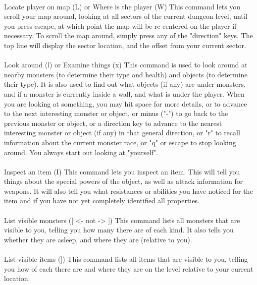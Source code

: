 \paragraph{}Locate player on map (L) or Where is the player (W) This
command lets you scroll your map around, looking at all sectors of the
current dungeon level, until you press escape, at which point the map
will be re-centered on the player if necessary. To scroll the map
around, simply press any of the "direction" keys. The top line will
display the sector location, and the offset from your current sector.

\paragraph{}Look around (l) or Examine things (x) This command is used
to look around at nearby monsters (to determine their type and health)
and objects (to determine their type). It is also used to find out what
objects (if any) are under monsters, and if a monster is currently
inside a wall, and what is under the player.  When you are looking at
something, you may hit space for more details, or to advance to the next
interesting monster or object, or minus ("-") to go back to the previous
monster or object, or a direction key to advance to the nearest
interesting monster or object (if any) in that general direction, or "r"
to recall information about the current monster race, or "q" or escape
to stop looking around. You always start out looking at "yourself".

\paragraph{}Inspect an item (I) This command lets you inspect an item.
This will tell you things about the special powers of the object, as
well as attack information for weapons. It will also tell you what
resistances or abilities you have noticed for the item and if you have
not yet completely identified all properties.
        
\paragraph{}List visible monsters ([ <- not -> ]) This command lists all
monsters that are visible to you, telling you how many there are of each
kind. It also tells you whether they are asleep, and where they are
(relative to you).

\paragraph{}List visible items (]) This command lists all items that are
visible to you, telling you how of each there are and where they are on
the level relative to your current location.

